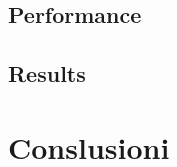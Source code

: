\documentclass[
10pt, %
a4paper, %
oneside, %
headinclude,footinclude, %
BCOR5mm, %
]{scrartcl}
\begin{document}
\subsection{Performance}

\subsection{Results}

\section{Conslusioni}


\renewcommand{\refname}{\spacedlowsmallcaps{References}} %




\end{document}
